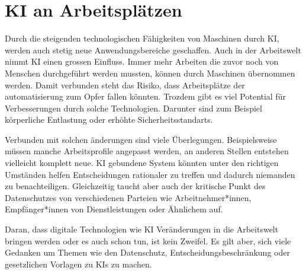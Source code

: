 \chapter{KI an Arbeitsplätzen}
\label{chap:ai-workingplaces}

Durch die steigenden technologischen Fähigkeiten von Maschinen durch KI, werden auch stetig neue Anwendungsbereiche geschaffen.
Auch in der Arbeitswelt nimmt KI einen grossen Einfluss. Immer mehr Arbeiten die zuvor noch von Menschen durchgeführt werden mussten, können durch Maschinen übernommen werden.
Damit verbunden steht das Risiko, dass Arbeitsplätze der automatisierung zum Opfer fallen könnten.
Trozdem gibt es viel Potential für Verbesserungen durch solche Technologien. Darunter sind zum Beispiel körperliche Entlastung oder erhöhte Sicherheitsstandarts.

Verbunden mit solchen änderungen sind viele Überlegungen. Beispielsweise müssen manche Arbeitsprofile angepasst werden, an anderen Stellen entstehen vielleicht komplett neue.
KI gebundene System könnten unter den richtigen Umständen helfen Entscheidungen rationaler zu treffen und dadurch niemanden zu benachteiligen. 
Gleichzeitig taucht aber auch der kritische Punkt des Datenschutzes von verschiedenen Parteien wie Arbeitnehmer*innen, Empfänger*innen von Dienstleistungen oder Ähnlichem auf.

Daran, dass digitale Technologien wie KI Veränderungen in die Arbeitswelt bringen werden oder es auch schon tun, ist kein Zweifel.
Es gilt aber, sich viele Gedanken um Themen wie den Datenschutz, Entscheidungsbeschränkung oder gesetzlichen Vorlagen zu KIs zu machen.